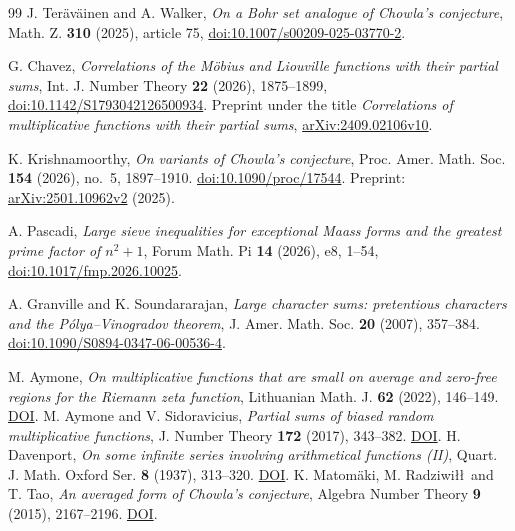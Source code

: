 \documentclass[11pt]{amsart}
\theoremstyle{definition}
\theoremstyle{remark}
\numberwithin{equation}{section}
\begin{document}
\begin{thebibliography}{99}
J. Ter\"av\"ainen and A. Walker, \emph{On a Bohr set analogue of
Chowla's conjecture}, Math. Z. \textbf{310} (2025), article 75,
\href{https://doi.org/10.1007/s00209-025-03770-2}
 {doi:10.1007/s00209-025-03770-2}.

G. Chavez, \emph{Correlations of the M\"obius and Liouville functions
with their partial sums}, Int. J. Number Theory \textbf{22} (2026), 1875--1899,
\href{https://doi.org/10.1142/S1793042126500934}
 {doi:10.1142/S1793042126500934}.
Preprint under the title \emph{Correlations of multiplicative functions
with their partial sums},
\href{https://arxiv.org/abs/2409.02106v10}{arXiv:2409.02106v10}.

K. Krishnamoorthy, \emph{On variants of Chowla's conjecture},
Proc. Amer. Math. Soc. \textbf{154} (2026), no.~5, 1897--1910.
\href{https://doi.org/10.1090/proc/17544}{doi:10.1090/proc/17544}.
Preprint: \href{https://arxiv.org/abs/2501.10962v2}{arXiv:2501.10962v2} (2025).

A. Pascadi, \emph{Large sieve inequalities for exceptional Maass forms
and the greatest prime factor of \(n^2+1\)},
Forum Math. Pi \textbf{14} (2026), e8, 1--54,
\href{https://doi.org/10.1017/fmp.2026.10025}
 {doi:10.1017/fmp.2026.10025}.

A. Granville and K. Soundararajan, \emph{Large character sums:
pretentious characters and the P\'olya--Vinogradov theorem},
J. Amer. Math. Soc. \textbf{20} (2007), 357--384.
\href{https://doi.org/10.1090/S0894-0347-06-00536-4}{doi:10.1090/S0894-0347-06-00536-4}.

 M. Aymone,
\emph{On multiplicative functions that are small on average and zero-free
regions for the Riemann zeta function}, Lithuanian Math. J. \textbf{62}
(2022), 146--149. \href{https://doi.org/10.1007/s10986-022-09555-y}{DOI}.
 M. Aymone and V. Sidoravicius,
\emph{Partial sums of biased random multiplicative functions},
J. Number Theory \textbf{172} (2017), 343--382.
\href{https://doi.org/10.1016/j.jnt.2016.08.020}{DOI}.
 H. Davenport,
\emph{On some infinite series involving arithmetical functions (II)},
Quart. J. Math. Oxford Ser. \textbf{8} (1937), 313--320.
\href{https://doi.org/10.1093/qmath/os-8.1.313}{DOI}.
 K. Matom\"aki, M. Radziwi\l\l\ and T. Tao,
\emph{An averaged form of Chowla's conjecture}, Algebra Number Theory
\textbf{9} (2015), 2167--2196.
\href{https://doi.org/10.2140/ant.2015.9.2167}{DOI}.
\end{thebibliography}
\endgroup
\end{document}
